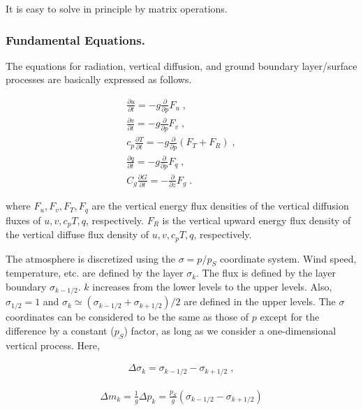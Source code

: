 It is easy to solve in principle by matrix operations.

\hypertarget{fundamental-equations.}{%
\subsubsection{Fundamental Equations.}\label{fundamental-equations.}}

The equations for radiation, vertical diffusion, and ground boundary layer/surface processes are basically expressed as follows.

\begin{eqnarray}
     \frac{\partial{u}}{\partial {t}}   =   - g \frac{\partial{}}{\partial {p}} F_u \; , \\
     \frac{\partial{v}}{\partial {t}}   =   - g \frac{\partial{}}{\partial {p}} F_v \; , \\
 c_p \frac{\partial{T}}{\partial {t}}   =   - g \frac{\partial{}}{\partial {p}} ( F_T + F_R ) \; , \\
     \frac{\partial{q}}{\partial {t}}   =   - g \frac{\partial{}}{\partial {p}} F_q \; , \\
 C_g \frac{\partial{G}}{\partial {t}}   =   -   \frac{\partial{}}{\partial {z}} F_g \; .
\end{eqnarray}

where \(F_u, F_v, F_T, F_q\) are the vertical energy flux densities of the vertical diffusion fluxes of \(u, v, c_p T, q\), respectively. \(F_R\) is the vertical upward energy flux density of the
vertical diffuse flux density of \(u, v, c_p T, q\), respectively.

The atmosphere is discretized using the \(\sigma=p/p_S\) coordinate system. Wind speed, temperature, etc. are defined by the layer \(\sigma_k\). The flux is defined by the layer boundary
\(\sigma_{k-1/2}\). \(k\) increases from the lower levels to the upper levels. Also, \(\sigma_{1/2} = 1\) and \(\sigma_{k} \simeq (\sigma_{k-1/2} + \sigma_{k+1/2})/2\) are defined in the upper levels.
The \(\sigma\) coordinates can be considered to be the same as those of \(p\) except for the difference by a constant (\(p_S\)) factor, as long as we consider a one-dimensional vertical process. Here,

\begin{eqnarray}
  \Delta \sigma_{k} = \sigma_{k-1/2} - \sigma_{k+1/2} \; ,
\end{eqnarray}

\begin{eqnarray}
  \Delta m_{k} = \frac{1}{g} \Delta p_k
   = \frac{p_S}{g} ( \sigma_{k-1/2} - \sigma_{k+1/2} )
\end{eqnarray}

